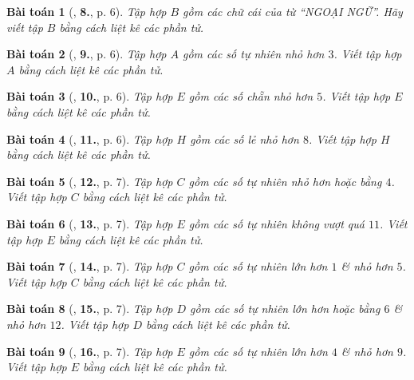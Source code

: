 \documentclass{article}
\numberwithin{equation}{section}
\newtheorem{baitoan}{Bài toán}[section]
\begin{document}
\begin{baitoan}[\cite{Trong_Toan_6_2021}, \textbf{8.}, p. 6]
	Tập hợp $B$ gồm các chữ cái của từ ``NGOẠI NGỮ''. Hãy viết tập $B$ bằng cách liệt kê các phần tử.
\end{baitoan}

\begin{baitoan}[\cite{Trong_Toan_6_2021}, \textbf{9.}, p. 6]
	Tập hợp $A$ gồm các số tự nhiên nhỏ hơn $3$. Viết tập hợp $A$ bằng cách liệt kê các phần tử.
\end{baitoan}

\begin{baitoan}[\cite{Trong_Toan_6_2021}, \textbf{10.}, p. 6]
	Tập hợp $E$ gồm các số chẵn nhỏ hơn $5$. Viết tập hợp $E$ bằng cách liệt kê các phần tử.
\end{baitoan}

\begin{baitoan}[\cite{Trong_Toan_6_2021}, \textbf{11.}, p. 6]
	Tập hợp $H$ gồm các số lẻ nhỏ hơn $8$. Viết tập hợp $H$ bằng cách liệt kê các phần tử.
\end{baitoan}

\begin{baitoan}[\cite{Trong_Toan_6_2021}, \textbf{12.}, p. 7]
	Tập hợp $C$ gồm các số tự nhiên nhỏ hơn hoặc bằng $4$. Viết tập hợp $C$ bằng cách liệt kê các phần tử.
\end{baitoan}

\begin{baitoan}[\cite{Trong_Toan_6_2021}, \textbf{13.}, p. 7]
	Tập hợp $E$ gồm các số tự nhiên không vượt quá $11$. Viết tập hợp $E$ bằng cách liệt kê các phần tử.
\end{baitoan}

\begin{baitoan}[\cite{Trong_Toan_6_2021}, \textbf{14.}, p. 7]
	Tập hợp $C$ gồm các số tự nhiên lớn hơn $1$ \& nhỏ hơn $5$. Viết tập hợp $C$ bằng cách liệt kê các phần tử.
\end{baitoan}

\begin{baitoan}[\cite{Trong_Toan_6_2021}, \textbf{15.}, p. 7]
	Tập hợp $D$ gồm các số tự nhiên lớn hơn hoặc bằng $6$ \& nhỏ hơn $12$. Viết tập hợp $D$ bằng cách liệt kê các phần tử.
\end{baitoan}

\begin{baitoan}[\cite{Trong_Toan_6_2021}, \textbf{16.}, p. 7]
	Tập hợp $E$ gồm các số tự nhiên lớn hơn $4$ \& nhỏ hơn $9$. Viết tập hợp $E$ bằng cách liệt kê các phần tử.
\end{baitoan}
\end{document}
